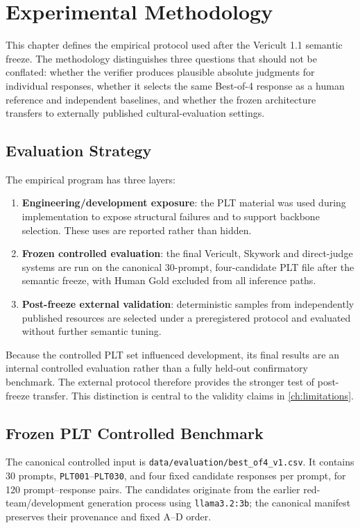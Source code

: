 \chapter{Experimental Methodology}
\label{ch:experiment}

This chapter defines the empirical protocol used after the Vericult 1.1 semantic freeze. The methodology distinguishes three questions that should not be conflated: whether the verifier produces plausible absolute judgments for individual responses, whether it selects the same Best-of-4 response as a human reference and independent baselines, and whether the frozen architecture transfers to externally published cultural-evaluation settings.

\section{Evaluation Strategy}

The empirical program has three layers:
\begin{enumerate}
    \item \textbf{Engineering/development exposure}: the PLT material was used during implementation to expose structural failures and to support backbone selection. These uses are reported rather than hidden.
    \item \textbf{Frozen controlled evaluation}: the final Vericult, Skywork and direct-judge systems are run on the canonical 30-prompt, four-candidate PLT file after the semantic freeze, with Human Gold excluded from all inference paths.
    \item \textbf{Post-freeze external validation}: deterministic samples from independently published resources are selected under a preregistered protocol and evaluated without further semantic tuning.
\end{enumerate}

Because the controlled PLT set influenced development, its final results are an internal controlled evaluation rather than a fully held-out confirmatory benchmark. The external protocol therefore provides the stronger test of post-freeze transfer. This distinction is central to the validity claims in \cref{ch:limitations}.

\section{Frozen PLT Controlled Benchmark}

The canonical controlled input is \texttt{data/evaluation/best\_of4\_v1.csv}. It contains 30 prompts, \texttt{PLT001}--\texttt{PLT030}, and four fixed candidate responses per prompt, for 120 prompt--response pairs. The candidates originate from the earlier red-team/development generation process using \texttt{llama3.2:3b}; the canonical manifest preserves their provenance and fixed A--D order.

